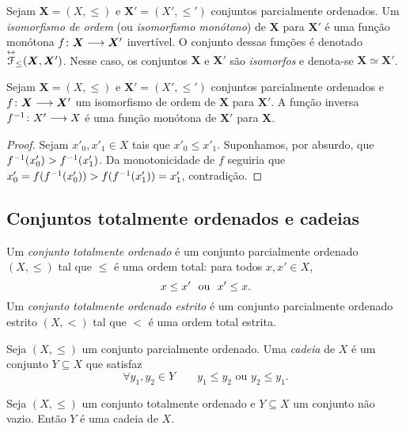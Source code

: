\begin{definition}
	Sejam $\bm X = (X,\leq)$ e $\bm X' = (X',\leq')$ conjuntos parcialmente ordenados. Um \emph{isomorfismo de ordem} (ou \emph{isomorfismo monótono}) de $\bm X$ para $\bm X'$ é uma função monótona ${f}\colon {\bm X} \longrightarrow {\bm X'}$ invertível. O conjunto dessas funções é denotado $\overset{\leftrightarrow}{\mathcal{F}}_\leq(\bm X, \bm X')$. Nesse caso, os conjuntos $\bm X$ e $\bm X'$ são \emph{isomorfos} e denota-se $\bm X \simeq \bm X'$.
\end{definition}

\begin{proposition}
	Sejam $\bm X = (X,\leq)$ e $\bm X' = (X',\leq')$ conjuntos parcialmente ordenados e ${f}\colon {\bm X} \longrightarrow {\bm X'}$ um isomorfismo de ordem de $\bm X$ para $\bm X'$. A função inversa ${f^{-1}}\colon {X'} \longrightarrow {X}$ é uma função monótona de $\bm X'$ para $\bm X$.
\end{proposition}
\begin{proof}
	Sejam $x'_0,x'_1 \in X$ tais que $x'_0 \leq x'_1$. Suponhamos, por absurdo, que $f^{-1}(x'_0) > f^{-1}(x'_1)$. Da monotonicidade de $f$ seguiria que $x'_0 = f(f^{-1}(x'_0)) > f(f^{-1}(x'_1)) = x'_1$, contradição.
\end{proof}

\subsection{Conjuntos totalmente ordenados e cadeias}

\begin{definition}
	Um \emph{conjunto totalmente ordenado} é um conjunto parcialmente ordenado $(X,\leq)$ tal que $\leq$ é uma ordem total: para todos $x,x' \in X$,
		\begin{equation*}
			x \leq x' \text{\ \ ou\ \ } x' \leq x.
		\end{equation*}
	Um \emph{conjunto totalmente ordenado estrito} é um conjunto parcialmente ordenado estrito $(X,<)$ tal que $<$ é uma ordem total estrita.
\end{definition}

\begin{definition}
	Seja $(X,\leq)$ um conjunto parcialmente ordenado. Uma \emph{cadeia} de $X$ é um conjunto $Y \subseteq X$ que satisfaz
	\begin{equation*}
	\forall y_1,y_2 \in Y \qquad y_1 \leq y_2 \text{\ \ ou\ \ } y_2 \leq y_1.
	\end{equation*}
\end{definition}

\begin{exercise}
	Seja $(X,\leq)$ um conjunto totalmente ordenado e $Y \subseteq X$ um conjunto não vazio. Então $Y$ é uma cadeia de $X$.
\end{exercise}

